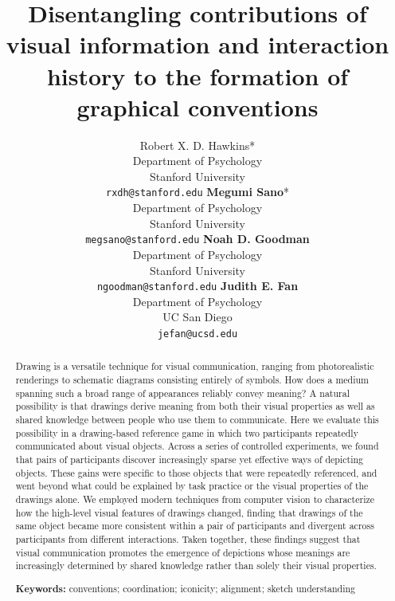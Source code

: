 \documentclass[10pt,letterpaper]{article}
\title{Disentangling contributions of visual information and interaction history to the formation of graphical conventions}
\author{
Robert X. D. Hawkins*  \\ Department of Psychology \\  Stanford University \\  \texttt{rxdh@stanford.edu}
 \And
\textbf{Megumi Sano}* \\ Department of Psychology \\  Stanford University \\ \texttt{megsano@stanford.edu}
 \And
\textbf{Noah D. Goodman} \\ Department of Psychology \\ Stanford University \\  \texttt{ngoodman@stanford.edu}
 \And
\textbf{Judith E. Fan} \\ Department of Psychology \\ UC San Diego \\ \texttt{jefan@ucsd.edu}
}
\begin{document}
\maketitle

\begin{abstract}
Drawing is a versatile technique for visual communication, ranging from photorealistic renderings to schematic diagrams consisting entirely of symbols.
How does a medium spanning such a broad range of appearances reliably convey meaning?
A natural possibility is that drawings derive meaning from both their visual properties as well as shared knowledge between people who use them to communicate.
Here we evaluate this possibility in a drawing-based reference game in which two participants repeatedly communicated about visual objects.
Across a series of controlled experiments, we found that pairs of participants discover increasingly sparse yet effective ways of depicting objects.
These gains were specific to those objects that were repeatedly referenced, and went beyond what could be explained by task practice or the visual properties of the drawings alone.
We employed modern techniques from computer vision to characterize how the high-level visual features of drawings changed, finding that drawings of the same object became more consistent within a pair of participants and divergent across participants from different interactions.
Taken together, these findings suggest that visual communication promotes the emergence of depictions whose meanings are increasingly determined by shared knowledge rather than solely their visual properties.

\textbf{Keywords:}
conventions; coordination; iconicity; alignment; sketch understanding


\end{abstract}
\end{document}
